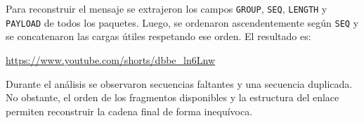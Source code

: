 \documentclass[12pt,a4paper]{article}
\begin{document}
Para reconstruir el mensaje se extrajeron los campos \texttt{GROUP},
\texttt{SEQ}, \texttt{LENGTH} y \texttt{PAYLOAD} de todos los paquetes. Luego,
se ordenaron ascendentemente según \texttt{SEQ} y se concatenaron las cargas
útiles respetando ese orden. El resultado es:

\begin{center}
\url{https://www.youtube.com/shorts/dbbe_ln6Lnw}
\end{center}

Durante el análisis se observaron secuencias faltantes y una secuencia
duplicada. No obstante, el orden de los fragmentos disponibles y la estructura
del enlace permiten reconstruir la cadena final de forma inequívoca.
\end{document}
